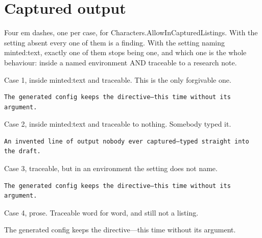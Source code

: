 \section{Captured output}
\label{sec:ch01-captured}

Four em dashes, one per case, for Characters.AllowInCapturedListings. With the
setting absent every one of them is a finding. With the setting naming
minted:text, exactly one of them stops being one, and which one is the whole
behaviour: inside a named environment AND traceable to a research note.

Case 1, inside minted:text and traceable. This is the only forgivable one.

\begin{verbatim}
The generated config keeps the directive—this time without its argument.
\end{verbatim}

Case 2, inside minted:text and traceable to nothing. Somebody typed it.

\begin{verbatim}
An invented line of output nobody ever captured—typed straight into the draft.
\end{verbatim}

Case 3, traceable, but in an environment the setting does not name.

\begin{verbatim}
The generated config keeps the directive—this time without its argument.
\end{verbatim}

Case 4, prose. Traceable word for word, and still not a listing.

The generated config keeps the directive—this time without its argument.

